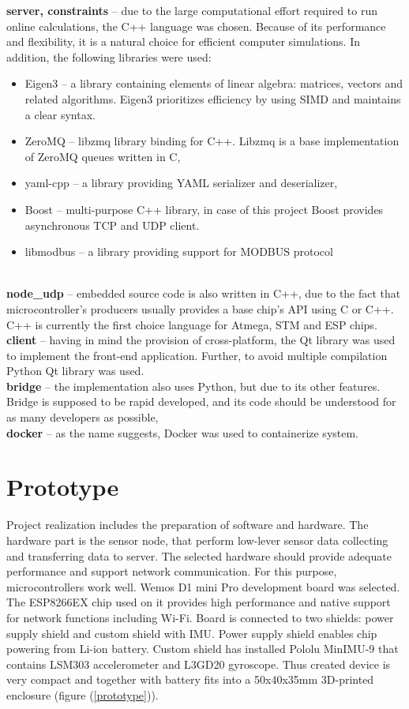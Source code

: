 \noindent\textbf{server, constraints} -- due to the large computational effort required to run online calculations, the C++ language was chosen. Because of its performance and flexibility, it is a natural choice for efficient computer simulations. In addition, the following libraries were used:
\begin{itemize}[noitemsep,nolistsep]
	\item Eigen3 -- a library containing elements of linear algebra: matrices, vectors and related algorithms. Eigen3 prioritizes efficiency by using SIMD and maintains a clear syntax.
	\item ZeroMQ -- libzmq library binding for C++. Libzmq is a base implementation of ZeroMQ queues written in C,
	\item yaml-cpp -- a library providing YAML serializer and deserializer,
	\item Boost -- multi-purpose C++ library, in case of this project Boost provides asynchronous TCP and UDP client. 
	\item libmodbus -- a library providing support for MODBUS protocol
\end{itemize}
\  \\
\textbf{node\_udp} -- embedded source code is also written in C++, due to the fact that microcontroller's producers usually provides a base chip's API using C or C++. C++ is currently the first choice language for Atmega, STM and ESP chips.\\

\noindent\textbf{client} -- having in mind the provision of cross-platform, the Qt library was used to implement the front-end application. Further, to avoid multiple compilation Python Qt library was used. \\

\noindent\textbf{bridge} -- the implementation also uses Python, but due to its other features. Bridge is supposed to be rapid developed, and its code should be understood for as many developers as possible,\\

\noindent\textbf{docker} -- as the name suggests, Docker was used to containerize system.   
	
\section{Prototype}
Project realization includes the preparation of software and hardware. The hardware part is the sensor node, that perform low-lever sensor data collecting and transferring data to server. The selected hardware should provide adequate performance and support network communication. For this purpose, microcontrollers work well. Wemos D1 mini Pro development board was selected. The ESP8266EX chip used on it provides high performance and native support for network functions including Wi-Fi. Board is connected to two shields: power supply shield and custom shield with IMU. Power supply shield enables chip powering from Li-ion battery. Custom shield has installed Pololu MinIMU-9 that contains LSM303 accelerometer and L3GD20 gyroscope. Thus created device is very compact and together with battery fits into a 50x40x35mm 3D-printed enclosure (figure (\ref{prototype})).

